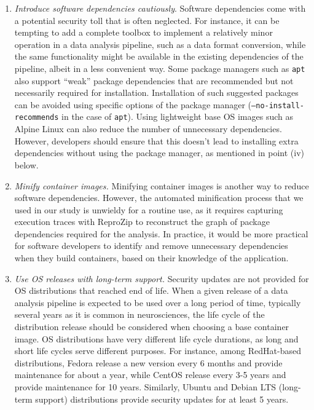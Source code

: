 \documentclass[a4paper,num-refs]{oup-contemporary}
\newcommand{\revision}[1]{\color{ao(english)}#1\color{black}\xspace}
\begin{document}
\begin{enumerate}[leftmargin=0pt,itemindent=*]
\item \emph{Introduce software dependencies cautiously}. Software
dependencies come with a potential security toll that is often neglected.
For instance, it can be tempting to add a complete toolbox to implement a
relatively minor operation in a data analysis pipeline, such as a data
format conversion, while the same functionality might be available in the
existing dependencies of the pipeline, albeit in a less convenient way. \revision{Some package managers such as \texttt{apt} also 
support ``weak'' package dependencies that are recommended but not necessarily required for installation. Installation of such suggested packages 
can be avoided using specific options of the package manager (\texttt{--no-install-recommends} in the case of \texttt{apt}).}
\revision{Using lightweight base OS images such as Alpine Linux can also reduce the number of unnecessary dependencies. 
However, developers should ensure that this doesn't lead to installing 
extra dependencies without using the package manager, as mentioned in point (iv) below.}

\revision{\item \emph{Minify container images.} \revision{Minifying container images 
is another way to reduce software dependencies. However,} the automated minification
process that we used in our study is unwieldy for a routine use, as it
requires capturing execution traces with ReproZip to reconstruct the graph
of package dependencies required for the analysis. In practice, it would be
more practical for software developers to identify and remove unnecessary
dependencies when they build containers, based on their knowledge of the
application.}

\item \emph{Use OS releases with long-term support.} Security updates are
not provided for OS distributions that reached end of life. When a given
release of a data analysis pipeline is expected to be used over a long
period of time, typically several years as it is common in neurosciences,
the life cycle of the distribution release should be considered when
choosing a base container image. OS distributions have very different life
cycle durations, as long and short life cycles serve different purposes.
For instance, among RedHat-based distributions, Fedora release a new version
every 6 months and provide maintenance for about a year, while CentOS
release every 3-5 years and provide maintenance for 10 years. Similarly,
Ubuntu \revision{and Debian} LTS (long-term support) distributions provide security updates
for \revision{at least} 5 years. 


\end{enumerate}
\end{document}
